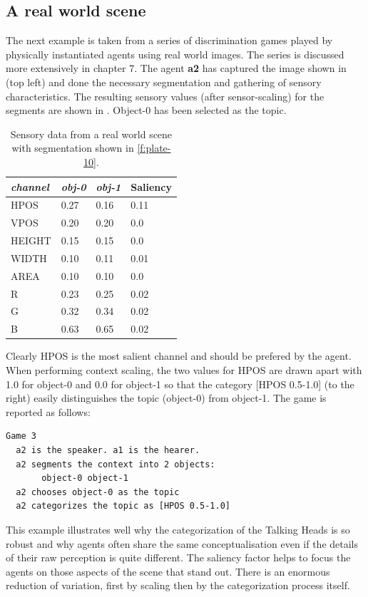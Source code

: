 \subsection{A real world scene}

The next example is taken from a series of discrimination 
games played by physically instantiated agents using 
real world images. The series is discussed more extensively 
in chapter 7. The agent {\bf a2} has 
captured the image shown in 
(top left) and done the necessary segmentation and 
gathering of sensory characteristics. The resulting sensory
values (after sensor-scaling) for the segments are shown
in . Object-0 has been selected as the topic. 
\begin{table}
\begin{center}
\begin{tabular}{| l | l | l | l |} \hline
{\it channel}& {\it obj-0} & {\it obj-1} & Saliency\\ \hline
HPOS & 0.27 & 0.16 & 0.11\\ \hline
VPOS & 0.20 & 0.20 & 0.0\\ \hline
HEIGHT & 0.15 & 0.15 & 0.0\\ \hline
WIDTH & 0.10 & 0.11 & 0.01\\ \hline
AREA & 0.10 & 0.10 & 0.0\\ \hline
R & 0.23 & 0.25 & 0.02\\ \hline
G & 0.32 & 0.34  & 0.02\\ \hline
B & 0.63 & 0.65 & 0.02\\ \hline
\end{tabular}
\caption{\label{tab:t-real} Sensory data from a real world scene with segmentation shown in \ref{f:plate-10}.}
\end{center}
\end{table}
Clearly HPOS is the most salient channel and should be 
prefered by the agent. When performing context scaling, 
the two values for HPOS are drawn apart with 1.0 for object-0 and 
0.0 for object-1 so that the category [HPOS 0.5-1.0] (to the 
right) easily distinguishes the topic (object-0) from
object-1. The game is reported as follows: 
\begin{verbatim}
Game 3 
  a2 is the speaker. a1 is the hearer. 
  a2 segments the context into 2 objects: 
       object-0 object-1
  a2 chooses object-0 as the topic 
  a2 categorizes the topic as [HPOS 0.5-1.0]
\end{verbatim}
This example illustrates well why the categorization 
of the Talking Heads is so robust and why agents 
often share the same conceptualisation even if the details  
of their raw perception is quite different. 
The saliency factor helps to focus the agents on those
aspects of the scene that stand out. There is 
an enormous reduction of variation, first by scaling then by 
the categorization process itself. 


